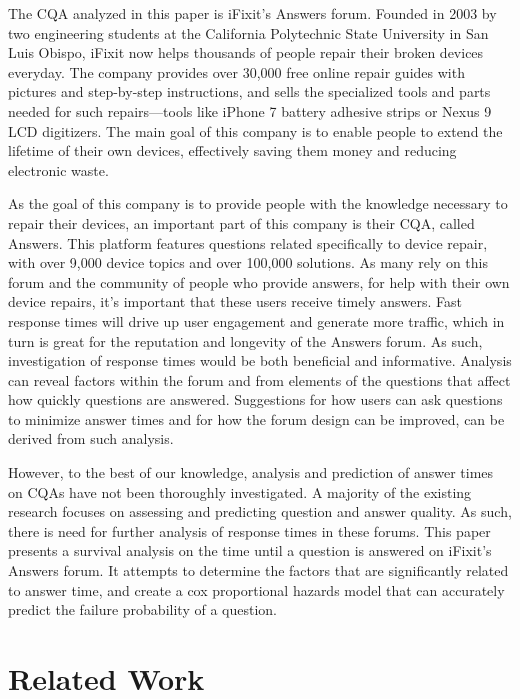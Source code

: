 \documentclass[12pt]{article}
\begin{document}
    The CQA analyzed in this paper is iFixit's Answers forum. Founded in 2003 by two engineering students at the California Polytechnic State University in San Luis Obispo, iFixit now helps thousands of people repair their broken devices everyday. The company provides over 30,000 free online repair guides with pictures and step-by-step instructions, and sells the specialized tools and parts needed for such repairs---tools like iPhone 7 battery adhesive strips or Nexus 9 LCD digitizers. The main goal of this company is to enable people to extend the lifetime of their own devices, effectively saving them money and reducing electronic waste. 
    
    As the goal of this company is to provide people with the knowledge necessary to repair their devices, an important part of this company is their CQA, called Answers. This platform features questions related specifically to device repair, with over 9,000 device topics and over 100,000 solutions. As many rely on this forum and the community of people who provide answers, for help with their own device repairs, it's important that these users receive timely answers. Fast response times will drive up user engagement and generate more traffic, which in turn is great for the reputation and longevity of the Answers forum. As such, investigation of response times would be both beneficial and informative. Analysis can reveal factors within the forum and from elements of the questions that affect how quickly questions are answered. Suggestions for how users can ask questions to minimize answer times and for how the forum design can be improved, can be derived from such analysis. 
    
    However, to the best of our knowledge, analysis and prediction of answer times on CQAs have not been thoroughly investigated. A majority of the existing research focuses on assessing and predicting question and answer quality. As such, there is need for further analysis of response times in these forums. This paper presents a survival analysis on the time until a question is answered on iFixit's Answers forum. It attempts to determine the factors that are significantly related to answer time, and create a cox proportional hazards model that can accurately predict the failure probability of a question.

\section{Related Work}
\end{document}
